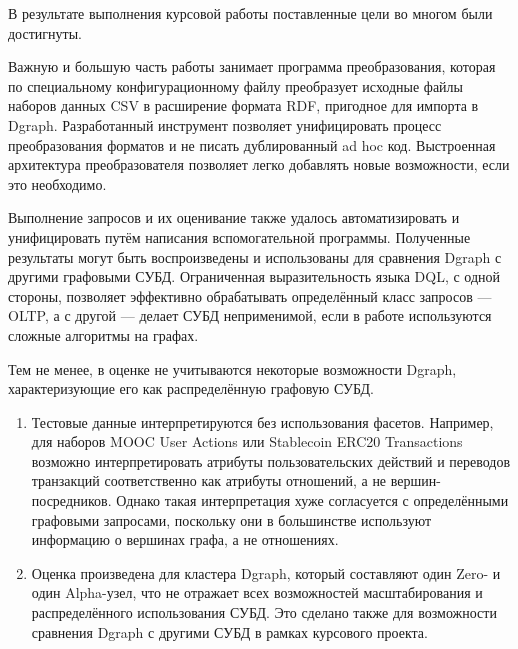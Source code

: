 
В результате выполнения курсовой работы поставленные цели во многом были достигнуты.

Важную и большую часть работы занимает программа преобразования, которая по специальному конфигурационному файлу
преобразует исходные файлы наборов данных CSV в расширение формата RDF, пригодное для импорта в Dgraph. Разработанный
инструмент позволяет унифицировать процесс преобразования форматов и не писать дублированный ad hoc код. Выстроенная
архитектура преобразователя позволяет легко добавлять новые возможности, если это необходимо.

Выполнение запросов и их оценивание также удалось автоматизировать и унифицировать путём написания вспомогательной
программы. Полученные результаты могут быть воспроизведены и использованы для сравнения Dgraph с другими графовыми СУБД.
Ограниченная выразительность языка DQL, с одной стороны, позволяет эффективно обрабатывать определённый класс запросов
--- OLTP, а с другой --- делает СУБД неприменимой, если в работе используются сложные алгоритмы на графах.

Тем не менее, в оценке не учитываются некоторые возможности Dgraph, характеризующие его как распределённую графовую СУБД.

\begin{enumerate}
\item Тестовые данные интерпретируются без использования фасетов. Например, для наборов MOOC User Actions или Stablecoin
ERC20 Transactions возможно интерпретировать атрибуты пользовательских действий и переводов транзакций соответственно как
атрибуты отношений, а не вершин-посредников. Однако такая интерпретация хуже согласуется с определёнными графовыми
запросами, поскольку они в большинстве используют информацию о вершинах графа, а не отношениях.
\item Оценка произведена для кластера Dgraph, который составляют один Zero- и один Alpha-узел, что не отражает всех
возможностей масштабирования и распределённого использования СУБД. Это сделано также для возможности сравнения Dgraph
с другими СУБД в рамках курсового проекта.
\end{enumerate}
